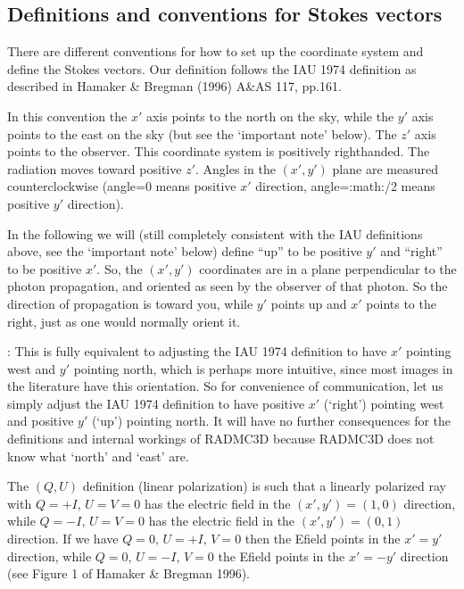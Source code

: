 \documentclass[letterpaper,10pt,english]{sphinxmanual}
\begin{document}
\subsection{Definitions and conventions for Stokes vectors}
\label{\detokenize{dustradtrans:definitions-and-conventions-for-stokes-vectors}}\label{\detokenize{dustradtrans:sec-definitions-stokes}}
There are different conventions for how to set up the coordinate system and
define the Stokes vectors. Our definition follows the IAU 1974 definition as
described in Hamaker \& Bregman (1996) A\&AS 117, pp.161.

In this convention the \(x'\) axis points to the north on the sky, while the
\(y'\) axis points to the east on the sky (but see the ‘important note’
below). The \(z'\) axis points to the observer. This coordinate system is
positively right\sphinxhyphen{}handed. The radiation moves toward positive \(z'\). Angles
in the \((x',y')\) plane are measured counter\sphinxhyphen{}clockwise (angle=0 means
positive \(x'\) direction, angle=:math:/2 means positive \(y'\)
direction).

In the following we will (still completely consistent with the IAU definitions
above, see the ‘important note’ below) define “up” to be positive \(y'\) and
“right” to be positive \(x'\). So, the \((x',y')\) coordinates are in a
plane perpendicular to the photon propagation, and oriented as seen by the
observer of that photon. So the direction of propagation is toward you, while
\(y'\) points up and \(x'\) points to the right, just as one would
normally orient it.

: This is fully equivalent to adjusting the IAU 1974 definition
to have \(x'\) pointing west and \(y'\) pointing north, which is perhaps
more intuitive, since most images in the literature have this orientation. So
for convenience of communication, let us simply adjust the IAU 1974 definition
to have positive \(x'\) (‘right’) pointing west and positive \(y'\)
(‘up’) pointing north.  It will have no further consequences for the definitions
and internal workings of RADMC\sphinxhyphen{}3D because RADMC\sphinxhyphen{}3D does not know what ‘north’
and ‘east’ are.

The \((Q,U)\) definition (linear polarization) is such that a linearly
polarized ray with \(Q=+I\), \(U=V=0\) has the electric field in the
\((x',y')=(1,0)\) direction, while \(Q=-I\), \(U=V=0\) has the
electric field in the \((x',y')=(0,1)\) direction. If we have \(Q=0\),
\(U=+I\), \(V=0\) then the E\sphinxhyphen{}field points in the \(x'=y'\)
direction, while \(Q=0\), \(U=-I\), \(V=0\) the E\sphinxhyphen{}field points in
the \(x'=-y'\) direction (see Figure 1 of Hamaker \& Bregman 1996).
\end{document}
